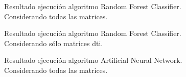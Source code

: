 \begin{figure}[H]
\centering
{}
\caption{Resultado ejecución algoritmo Random Forest Classifier. Considerando todas las matrices.}
\label{figure:forestall}
\end{figure}

\begin{figure}[H]
\centering
{}
\caption{Resultado ejecución algoritmo Random Forest Classifier. Considerando sólo matrices \gls{dti}.}
\label{figure:forestdit}

\end{figure}
\begin{figure}[H]
\centering
{}
\caption{Resultado ejecución algoritmo Artificial Neural Network. Considerando todas las matrices.}
\label{figure:annall}
\end{figure}

